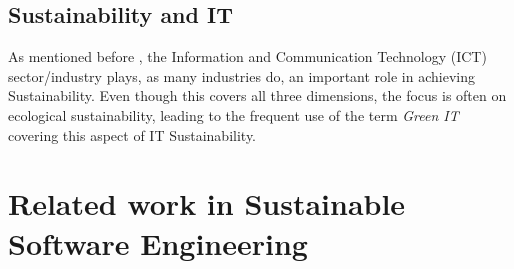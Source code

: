 

\section{Sustainability and IT}  %
As mentioned before %
, the Information and Communication Technology (ICT) %
sector/industry plays, as many industries do, an important role in achieving Sustainability. Even though this covers all three dimensions, the focus is often on ecological sustainability, leading to the frequent use of the term \textit{Green IT} covering this aspect of IT Sustainability. %








\chapter{Related work in Sustainable Software Engineering}
